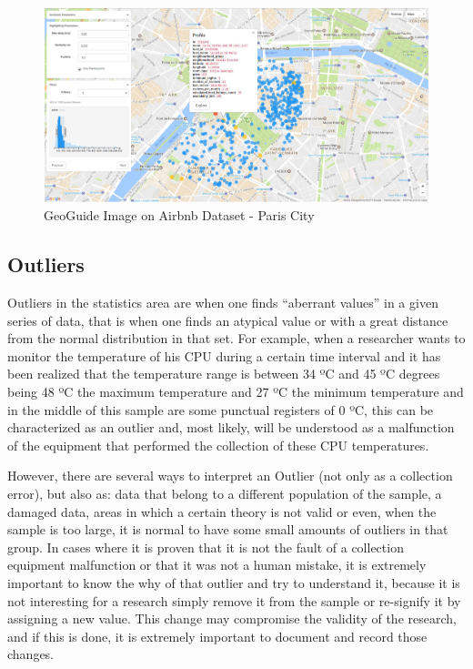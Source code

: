 \begin{figure}[t]
	\centering
	\includegraphics[width=\textwidth]{images/geoguide-example-airbnb}
	\caption{GeoGuide Image on Airbnb Dataset - Paris City}
	\label{fig:geoguide-example-airbnb}
	\vspace{-10pt}
\end{figure}

\subsection{Outliers}


Outliers in the statistics area are when one finds ``aberrant values'' in a given series of data, that is when one finds an atypical value or with a great distance from the normal distribution in that set. For example, when a researcher wants to monitor the temperature of his CPU during a certain time interval and it has been realized that the temperature range is between 34 ºC and 45 ºC degrees being 48 ºC the maximum temperature and 27 ºC the minimum temperature and in the middle of this sample are some punctual registers of 0 ºC, this can be characterized as an outlier and, most likely, will be understood as a malfunction of the equipment that performed the collection of these CPU temperatures.

However, there are several ways to interpret an Outlier (not only as a collection error), but also as: data that belong to a different population of the sample, a damaged data, areas in which a certain theory is not valid or even, when the sample is too large, it is normal to have some small amounts of outliers in that group. In cases where it is proven that it is not the fault of a collection equipment malfunction or that it was not a human mistake, it is extremely important to know the why of that outlier and try to understand it, because it is not interesting for a research simply remove it from the sample or re-signify it by assigning a new value. This change may compromise the validity of the research, and if this is done, it is extremely important to document and record those changes.

